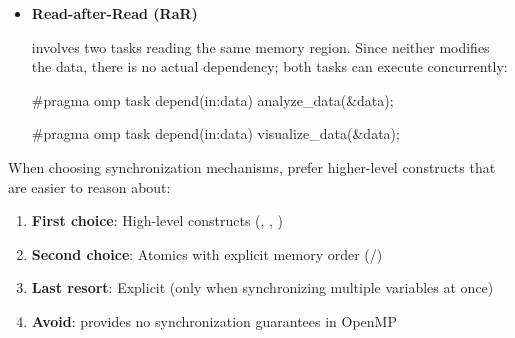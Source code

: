\begin{itemize}
\begin{codeblock}[language=C]
#pragma omp task depend(out:x)
reinitialize_x(&x);
\end{codeblock}

\item \textbf{Read-after-Read (RaR)} 

involves two tasks reading the same memory region. Since neither modifies the data, there is no actual dependency; both tasks can execute concurrently:

\begin{codeblock}[language=C]
#pragma omp task depend(in:data)
analyze_data(&data);

#pragma omp task depend(in:data)
visualize_data(&data);
\end{codeblock}
\end{itemize}

\begin{tipsblock}
When choosing synchronization mechanisms, prefer higher-level constructs that are easier to reason about:

\begin{enumerate}
    \item \textbf{First choice}: High-level constructs (, , )
    \item \textbf{Second choice}: Atomics with explicit memory order (/)
    \item \textbf{Last resort}: Explicit  (only when synchronizing multiple variables at once)
    \item \textbf{Avoid}:  provides no synchronization guarantees in OpenMP
\end{enumerate}
\end{tipsblock}